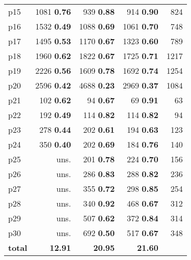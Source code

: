 \begin{tabular}{lrrrr}
\multicolumn{1}{l|}{p15} & {\footnotesize 1081} \textbf{0.76} & {\footnotesize 939} \textbf{0.88} & {\footnotesize 914} \textbf{0.90} & \multicolumn{1}{|r}{824}\\
\multicolumn{1}{l|}{p16} & {\footnotesize 1532} \textbf{0.49} & {\footnotesize 1088} \textbf{0.69} & {\footnotesize 1061} \textbf{0.70} & \multicolumn{1}{|r}{748}\\
\multicolumn{1}{l|}{p17} & {\footnotesize 1495} \textbf{0.53} & {\footnotesize 1170} \textbf{0.67} & {\footnotesize 1323} \textbf{0.60} & \multicolumn{1}{|r}{789}\\
\multicolumn{1}{l|}{p18} & {\footnotesize 1960} \textbf{0.62} & {\footnotesize 1822} \textbf{0.67} & {\footnotesize 1725} \textbf{0.71} & \multicolumn{1}{|r}{1217}\\
\multicolumn{1}{l|}{p19} & {\footnotesize 2226} \textbf{0.56} & {\footnotesize 1609} \textbf{0.78} & {\footnotesize 1692} \textbf{0.74} & \multicolumn{1}{|r}{1254}\\
\multicolumn{1}{l|}{p20} & {\footnotesize 2596} \textbf{0.42} & {\footnotesize 4688} \textbf{0.23} & {\footnotesize 2969} \textbf{0.37} & \multicolumn{1}{|r}{1084}\\
\multicolumn{1}{l|}{p21} & {\footnotesize 102} \textbf{0.62} & {\footnotesize 94} \textbf{0.67} & {\footnotesize 69} \textbf{0.91} & \multicolumn{1}{|r}{63}\\
\multicolumn{1}{l|}{p22} & {\footnotesize 192} \textbf{0.49} & {\footnotesize 114} \textbf{0.82} & {\footnotesize 114} \textbf{0.82} & \multicolumn{1}{|r}{94}\\
\multicolumn{1}{l|}{p23} & {\footnotesize 278} \textbf{0.44} & {\footnotesize 202} \textbf{0.61} & {\footnotesize 194} \textbf{0.63} & \multicolumn{1}{|r}{123}\\
\multicolumn{1}{l|}{p24} & {\footnotesize 350} \textbf{0.40} & {\footnotesize 202} \textbf{0.69} & {\footnotesize 184} \textbf{0.76} & \multicolumn{1}{|r}{140}\\
\multicolumn{1}{l|}{p25} & uns. & {\footnotesize 201} \textbf{0.78} & {\footnotesize 224} \textbf{0.70} & \multicolumn{1}{|r}{156}\\
\multicolumn{1}{l|}{p26} & uns. & {\footnotesize 286} \textbf{0.83} & {\footnotesize 288} \textbf{0.82} & \multicolumn{1}{|r}{236}\\
\multicolumn{1}{l|}{p27} & uns. & {\footnotesize 355} \textbf{0.72} & {\footnotesize 298} \textbf{0.85} & \multicolumn{1}{|r}{254}\\
\multicolumn{1}{l|}{p28} & uns. & {\footnotesize 340} \textbf{0.92} & {\footnotesize 468} \textbf{0.67} & \multicolumn{1}{|r}{312}\\
\multicolumn{1}{l|}{p29} & uns. & {\footnotesize 507} \textbf{0.62} & {\footnotesize 372} \textbf{0.84} & \multicolumn{1}{|r}{314}\\
\multicolumn{1}{l|}{p30} & uns. & {\footnotesize 692} \textbf{0.50} & {\footnotesize 517} \textbf{0.67} & \multicolumn{1}{|r}{348}\\
\midrule
\textbf{total} & \textbf{12.91} & \textbf{20.95} & \textbf{21.60} & \\
\bottomrule
\end{tabular}

